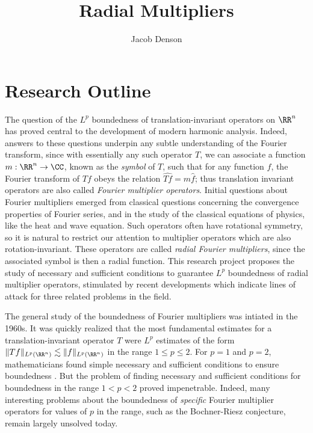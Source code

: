 

\title{Radial Multipliers}
\author{Jacob Denson}



\maketitle

\tableofcontents

\newpage

\chapter{Research Outline}

The question of the $L^p$ boundedness of translation-invariant operators on $\RR^n$ has proved central to the development of modern harmonic analysis. Indeed, answers to these questions underpin any subtle understanding of the Fourier transform, since with essentially any such operator $T$, we can associate a function $m: \RR^n \to \CC$, known as the \emph{symbol} of $T$, such that for any function $f$, the Fourier transform of $Tf$ obeys the relation $\widehat{Tf} = m \widehat{f}$; thus translation invariant operators are also called \emph{Fourier multiplier operators}. Initial questions about Fourier multipliers emerged from classical questions concerning the convergence properties of Fourier series, and in the study of the classical equations of physics, like the heat and wave equation. Such operators often have rotational symmetry, so it is natural to restrict our attention to multiplier operators which are also rotation-invariant. These operators are called \emph{radial Fourier multipliers}, since the associated symbol is then a radial function. This research project proposes the study of necessary and sufficient conditions to guarantee $L^p$ boundedness of radial multiplier operators, stimulated by recent developments which indicate lines of attack for three related problems in the field.

The general study of the boundedness of Fourier multipliers was intiated in the 1960s. It was quickly realized that the most fundamental estimates for a translation-invariant operator $T$ were $L^p$ estimates of the form $\| Tf \|_{L^p(\RR^n)} \lesssim \| f \|_{L^p(\RR^n)}$ in the range $1 \leq p \leq 2$. For $p = 1$ and $p = 2$, mathematicians found simple necessary and sufficient conditions to ensure boundedness \cite{Hormander1}. But the problem of finding necessary and sufficient conditions for boundedness in the range $1 < p < 2$ proved impenetrable. Indeed, many interesting problems about the boundedness of \emph{specific} Fourier multiplier operators for values of $p$ in the range, such as the Bochner-Riesz conjecture, remain largely unsolved today.

